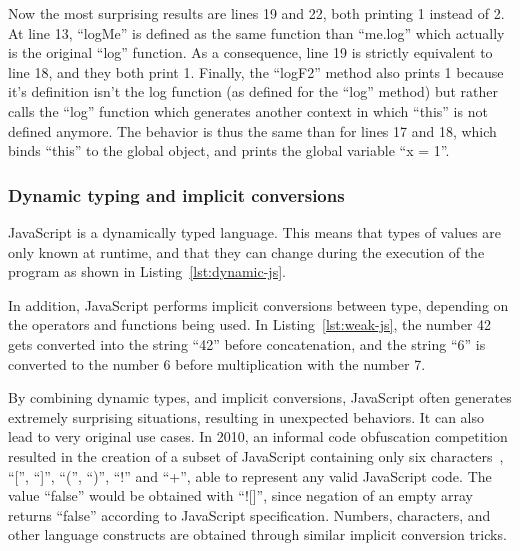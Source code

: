 Now the most surprising results are lines 19 and 22, both printing 1 instead of 2.
At line 13, ``logMe'' is defined as the same function than ``me.log'' which
actually is the original ``log'' function.
As a consequence, line 19 is strictly equivalent to line 18, and they both print 1.
Finally, the ``logF2'' method also prints 1 because it's definition isn't the log function
(as defined for the ``log'' method) but rather calls the ``log'' function which
generates another context in which ``this'' is not defined anymore.
The behavior is thus the same than for lines 17 and 18, which binds ``this'' to the global object,
and prints the global variable ``x = 1''.

\subsubsection{Dynamic typing and implicit conversions}%
\label{ssub:dynamic_typing_and_implicit_conversions}

JavaScript is a dynamically typed language.
This means that types of values are only known at runtime,
and that they can change during the execution of the program
as shown in Listing~\ref{lst:dynamic-js}.



In addition, JavaScript performs implicit conversions between type,
depending on the operators and functions being used.
In Listing~\ref{lst:weak-js}, the number 42 gets converted into the string ``42''
before concatenation, and the string ``6'' is converted to the number 6
before multiplication with the number 7.


By combining dynamic types, and implicit conversions,
JavaScript often generates extremely surprising situations,
resulting in unexpected behaviors.
It can also lead to very original use cases.
In 2010, an informal code obfuscation competition resulted in the creation
of a subset of JavaScript containing only six characters~\cite{jsfuck},
``['', ``]'', ``('', ``)'', ``!'' and ``+'',
able to represent any valid JavaScript code.
The value ``false'' would be obtained with ``![]'',
since negation of an empty array returns ``false'' according to JavaScript specification.
Numbers, characters, and other language constructs are obtained through similar
implicit conversion tricks.

